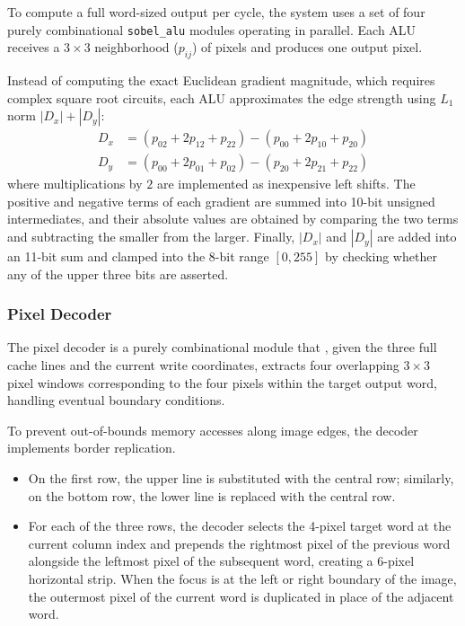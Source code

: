 To compute a full word-sized output per cycle, the system uses a set of four purely combinational \texttt{sobel\_alu} modules operating in parallel. Each ALU receives a $3\times3$ neighborhood ($p_{ij}$) of pixels and produces one output pixel.

Instead of computing the exact Euclidean gradient magnitude, which requires complex square root circuits, each ALU approximates the edge strength using $L_1$ norm $|D_x| + |D_y|$:
\begin{align*}
    D_x &= (p_{02} + 2p_{12} + p_{22}) - (p_{00} + 2p_{10} + p_{20}) \\
    D_y &= (p_{00} + 2p_{01} + p_{02}) - (p_{20} + 2p_{21} + p_{22})
\end{align*}
where multiplications by $2$ are implemented as inexpensive left shifts. The positive and negative terms of each gradient are summed into 10-bit unsigned intermediates, and their absolute values are obtained by comparing the two terms and subtracting the smaller from the larger.  
Finally, $|D_x|$ and $|D_y|$ are added into an 11-bit sum and clamped into the 8-bit range $[0,255]$ by checking whether any of the upper three bits are asserted.

\subsubsection{Pixel Decoder}

The pixel decoder is a  purely combinational module that , given the three full cache lines and the current write coordinates, extracts four overlapping $3\times3$ pixel windows corresponding to the four pixels within the target output word, handling eventual boundary conditions. 

To prevent out-of-bounds memory accesses along image edges, the decoder implements border replication.
\begin{itemize}
    \item On the first row, the upper line is substituted with the central row; similarly, on the bottom row, the lower line is replaced with the central row.

    \item For each of the three rows, the decoder selects the 4-pixel target word at the current column index and prepends the rightmost pixel of the previous word alongside the leftmost pixel of the subsequent word, creating a 6-pixel horizontal strip. When the focus is at the left or right boundary of the image, the outermost pixel of the current word is duplicated in place of the adjacent word.
\end{itemize}

